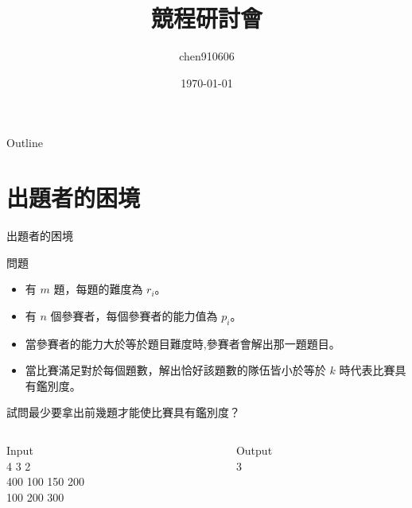 \documentclass[xcolor=table]{beamer}
\title{競程研討會}
\author{chen910606}
\institute[]{CCUPC}
\date{\today}
\begin{document}
\begin{frame}
\titlepage
\end{frame}

\begin{frame}{Outline}
    \tableofcontents 
\end{frame}

\section{出題者的困境}
\begin{frame}{出題者的困境}
    \begin{block}{問題}
         \begin{itemize}
             \item 有 $m$ 題，每題的難度為 $r_i$。
             \item 有 $n$ 個參賽者，每個參賽者的能力值為 $p_i$。
             \item 當參賽者的能力大於等於題目難度時,參賽者會解出那一題題目。
             \item 當比賽滿足對於每個題數，解出恰好該題數的隊伍皆小於等於 $k$ 時代表比賽具有鑑別度。
         \end{itemize}
            試問最少要拿出前幾題才能使比賽具有鑑別度？
    \end{block}
    \vspace{10pt}
    \begin{columns}
        \begin{column}{0.45\textwidth}
            Input\\[1mm]
            4 3 2\\
            400 100 150 200\\
            100 200 300
        \end{column}
        \begin{column}{0.45\textwidth}
            Output\\[1mm]
            3  \vspace{25pt}
        \end{column}
    \end{columns}
\end{frame}
\end{document}
